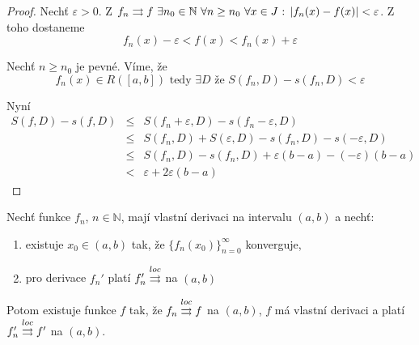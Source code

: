 \begin{proof}
Nechť $\varepsilon > 0$. Z $f_n \con f \ \exists n_0 \in \mathbb{N} \ \forall n \geq n_0 \ \forall x \in J \textrm{ : } |f_n(x) - f(x)| < \varepsilon$. Z toho dostaneme
$$f_n(x) - \varepsilon < f(x) < f_n(x) + \varepsilon$$

Nechť $n \geq n_0$ je pevné. Víme, že 
$$f_n(x) \in R([a,b]) \textrm{ tedy } \exists D \textrm{ že } S(f_n,D) - s(f_n,D) < \varepsilon$$

Nyní
\begin{eqnarray*}
S(f,D) - s(f,D) & \leq & S(f_n+\varepsilon, D) - s(f_n-\varepsilon,D) \\
& \leq & S(f_n,D)+S(\varepsilon,D) - s(f_n,D) - s(-\varepsilon,D) \\
& \leq & S(f_n,D) - s(f_n,D) +\varepsilon(b-a) - (-\varepsilon)(b-a) \\
& < & \varepsilon +2\varepsilon(b-a)
\end{eqnarray*}
\end{proof}

\begin{vetat}
Nechť funkce $f_n$, $n \in \mathbb{N}$, mají vlastní derivaci na intervalu $(a,b)$ a nechť:
\begin{enumerate}
\item existuje $x_0 \in (a,b)$ tak, že $\{f_n(x_0)\}_{n=0}^{\infty}$ konverguje,
\item pro derivace $f_n'$ platí $f_n' \overset{loc}{\rightrightarrows}$ na $(a,b)$
\end{enumerate}
Potom existuje funkce $f$ tak, že $f_n \overset{loc}{\rightrightarrows} f$ na $(a,b)$, $f$ má vlastní derivaci a platí $f_n' \overset{loc}{\rightrightarrows} f'$ na $(a,b)$.
\end{vetat}

